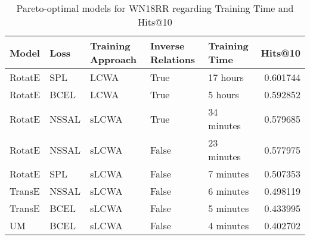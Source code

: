\begin{table}
\centering
\caption{Pareto-optimal models for WN18RR regarding Training Time and Hits@10}
\begin{tabular}{lllllr}
\toprule
  Model &   Loss & Training Approach & Inverse Relations & Training Time &   Hits@10 \\
\midrule
 RotatE &    SPL &              LCWA &              True &      17 hours &  0.601744 \\
 RotatE &   BCEL &              LCWA &              True &       5 hours &  0.592852 \\
 RotatE &  NSSAL &             sLCWA &              True &    34 minutes &  0.579685 \\
 RotatE &  NSSAL &             sLCWA &             False &    23 minutes &  0.577975 \\
 RotatE &    SPL &             sLCWA &             False &     7 minutes &  0.507353 \\
 TransE &  NSSAL &             sLCWA &             False &     6 minutes &  0.498119 \\
 TransE &   BCEL &             sLCWA &             False &     5 minutes &  0.433995 \\
     UM &   BCEL &             sLCWA &             False &     4 minutes &  0.402702 \\
\bottomrule
\end{tabular}
\end{table}

